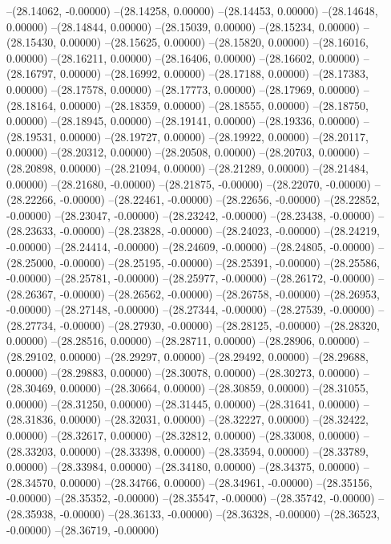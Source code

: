 --(28.14062, -0.00000)
--(28.14258, 0.00000)
--(28.14453, 0.00000)
--(28.14648, 0.00000)
--(28.14844, 0.00000)
--(28.15039, 0.00000)
--(28.15234, 0.00000)
--(28.15430, 0.00000)
--(28.15625, 0.00000)
--(28.15820, 0.00000)
--(28.16016, 0.00000)
--(28.16211, 0.00000)
--(28.16406, 0.00000)
--(28.16602, 0.00000)
--(28.16797, 0.00000)
--(28.16992, 0.00000)
--(28.17188, 0.00000)
--(28.17383, 0.00000)
--(28.17578, 0.00000)
--(28.17773, 0.00000)
--(28.17969, 0.00000)
--(28.18164, 0.00000)
--(28.18359, 0.00000)
--(28.18555, 0.00000)
--(28.18750, 0.00000)
--(28.18945, 0.00000)
--(28.19141, 0.00000)
--(28.19336, 0.00000)
--(28.19531, 0.00000)
--(28.19727, 0.00000)
--(28.19922, 0.00000)
--(28.20117, 0.00000)
--(28.20312, 0.00000)
--(28.20508, 0.00000)
--(28.20703, 0.00000)
--(28.20898, 0.00000)
--(28.21094, 0.00000)
--(28.21289, 0.00000)
--(28.21484, 0.00000)
--(28.21680, -0.00000)
--(28.21875, -0.00000)
--(28.22070, -0.00000)
--(28.22266, -0.00000)
--(28.22461, -0.00000)
--(28.22656, -0.00000)
--(28.22852, -0.00000)
--(28.23047, -0.00000)
--(28.23242, -0.00000)
--(28.23438, -0.00000)
--(28.23633, -0.00000)
--(28.23828, -0.00000)
--(28.24023, -0.00000)
--(28.24219, -0.00000)
--(28.24414, -0.00000)
--(28.24609, -0.00000)
--(28.24805, -0.00000)
--(28.25000, -0.00000)
--(28.25195, -0.00000)
--(28.25391, -0.00000)
--(28.25586, -0.00000)
--(28.25781, -0.00000)
--(28.25977, -0.00000)
--(28.26172, -0.00000)
--(28.26367, -0.00000)
--(28.26562, -0.00000)
--(28.26758, -0.00000)
--(28.26953, -0.00000)
--(28.27148, -0.00000)
--(28.27344, -0.00000)
--(28.27539, -0.00000)
--(28.27734, -0.00000)
--(28.27930, -0.00000)
--(28.28125, -0.00000)
--(28.28320, 0.00000)
--(28.28516, 0.00000)
--(28.28711, 0.00000)
--(28.28906, 0.00000)
--(28.29102, 0.00000)
--(28.29297, 0.00000)
--(28.29492, 0.00000)
--(28.29688, 0.00000)
--(28.29883, 0.00000)
--(28.30078, 0.00000)
--(28.30273, 0.00000)
--(28.30469, 0.00000)
--(28.30664, 0.00000)
--(28.30859, 0.00000)
--(28.31055, 0.00000)
--(28.31250, 0.00000)
--(28.31445, 0.00000)
--(28.31641, 0.00000)
--(28.31836, 0.00000)
--(28.32031, 0.00000)
--(28.32227, 0.00000)
--(28.32422, 0.00000)
--(28.32617, 0.00000)
--(28.32812, 0.00000)
--(28.33008, 0.00000)
--(28.33203, 0.00000)
--(28.33398, 0.00000)
--(28.33594, 0.00000)
--(28.33789, 0.00000)
--(28.33984, 0.00000)
--(28.34180, 0.00000)
--(28.34375, 0.00000)
--(28.34570, 0.00000)
--(28.34766, 0.00000)
--(28.34961, -0.00000)
--(28.35156, -0.00000)
--(28.35352, -0.00000)
--(28.35547, -0.00000)
--(28.35742, -0.00000)
--(28.35938, -0.00000)
--(28.36133, -0.00000)
--(28.36328, -0.00000)
--(28.36523, -0.00000)
--(28.36719, -0.00000)
